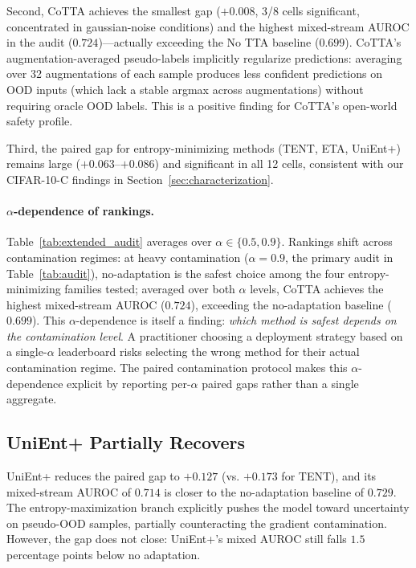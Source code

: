 Second, CoTTA achieves the smallest gap ($+0.008$, 3/8 cells significant, concentrated in gaussian-noise conditions) and the highest mixed-stream AUROC in the audit ($0.724$)---actually exceeding the No TTA baseline ($0.699$).
CoTTA's augmentation-averaged pseudo-labels implicitly regularize predictions: averaging over 32 augmentations of each sample produces less confident predictions on OOD inputs (which lack a stable argmax across augmentations) without requiring oracle OOD labels.
This is a positive finding for CoTTA's open-world safety profile.

Third, the paired gap for entropy-minimizing methods (TENT, ETA, UniEnt+) remains large ($+0.063$--$+0.086$) and significant in all 12 cells, consistent with our CIFAR-10-C findings in Section~\ref{sec:characterization}.

\paragraph{$\alpha$-dependence of rankings.}
Table~\ref{tab:extended_audit} averages over $\alpha \in \{0.5, 0.9\}$.
Rankings shift across contamination regimes: at heavy contamination ($\alpha = 0.9$, the primary audit in Table~\ref{tab:audit}), no-adaptation is the safest choice among the four entropy-minimizing families tested; averaged over both $\alpha$ levels, CoTTA achieves the highest mixed-stream AUROC ($0.724$), exceeding the no-adaptation baseline ($0.699$).
This $\alpha$-dependence is itself a finding: \emph{which method is safest depends on the contamination level}.
A practitioner choosing a deployment strategy based on a single-$\alpha$ leaderboard risks selecting the wrong method for their actual contamination regime.
The paired contamination protocol makes this $\alpha$-dependence explicit by reporting per-$\alpha$ paired gaps rather than a single aggregate.

\subsection{UniEnt+ Partially Recovers}

UniEnt+ reduces the paired gap to $+0.127$ (vs. $+0.173$ for TENT), and its mixed-stream AUROC of $0.714$ is closer to the no-adaptation baseline of $0.729$.
The entropy-maximization branch explicitly pushes the model toward uncertainty on pseudo-OOD samples, partially counteracting the gradient contamination.
However, the gap does not close: UniEnt+'s mixed AUROC still falls $1.5$ percentage points below no adaptation.

